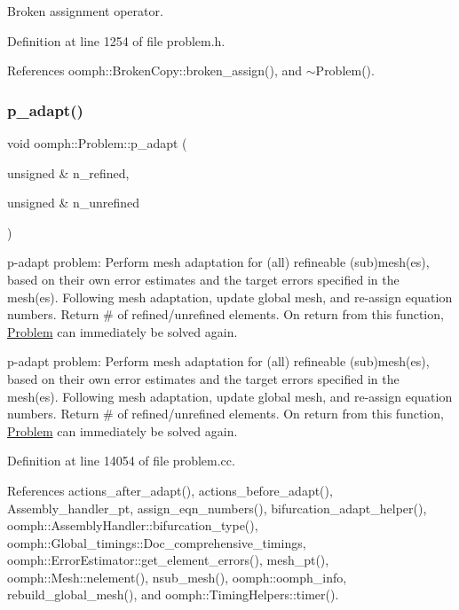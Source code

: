 Broken assignment operator. 



Definition at line 1254 of file problem.\+h.



References oomph\+::\+Broken\+Copy\+::broken\+\_\+assign(), and $\sim$\+Problem().

\mbox{\label{classoomph_1_1Problem_a1303b2fde2fe84b71519cadabc18f868}} 
\subsubsection{\texorpdfstring{p\+\_\+adapt()}{p\_adapt()}\hspace{0.1cm}{\footnotesize\ttfamily [1/2]}}
{\footnotesize\ttfamily void oomph\+::\+Problem\+::p\+\_\+adapt (\begin{DoxyParamCaption}\item[{unsigned \&}]{n\+\_\+refined,  }\item[{unsigned \&}]{n\+\_\+unrefined }\end{DoxyParamCaption})}



p-\/adapt problem\+: Perform mesh adaptation for (all) refineable (sub)mesh(es), based on their own error estimates and the target errors specified in the mesh(es). Following mesh adaptation, update global mesh, and re-\/assign equation numbers. Return \# of refined/unrefined elements. On return from this function, \hyperlink{classoomph_1_1Problem}{Problem} can immediately be solved again. 

p-\/adapt problem\+: Perform mesh adaptation for (all) refineable (sub)mesh(es), based on their own error estimates and the target errors specified in the mesh(es). Following mesh adaptation, update global mesh, and re-\/assign equation numbers. Return \# of refined/unrefined elements. On return from this function, \hyperlink{classoomph_1_1Problem}{Problem} can immediately be solved again. 

Definition at line 14054 of file problem.\+cc.



References actions\+\_\+after\+\_\+adapt(), actions\+\_\+before\+\_\+adapt(), Assembly\+\_\+handler\+\_\+pt, assign\+\_\+eqn\+\_\+numbers(), bifurcation\+\_\+adapt\+\_\+helper(), oomph\+::\+Assembly\+Handler\+::bifurcation\+\_\+type(), oomph\+::\+Global\+\_\+timings\+::\+Doc\+\_\+comprehensive\+\_\+timings, oomph\+::\+Error\+Estimator\+::get\+\_\+element\+\_\+errors(), mesh\+\_\+pt(), oomph\+::\+Mesh\+::nelement(), nsub\+\_\+mesh(), oomph\+::oomph\+\_\+info, rebuild\+\_\+global\+\_\+mesh(), and oomph\+::\+Timing\+Helpers\+::timer().

